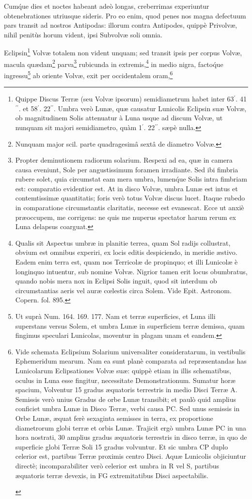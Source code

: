 \documentclass[a4paper, 11pt, oneside, polutonikogreek, german]{article}
\begin{document}
Cum\'que dies et noctes habeant adeò longas, creberrimas experiuntur obtenebrationes utriusque sideris. Pro eo enim, quod penes nos magna defectuum pars transit ad nostros Antipodas: illorum contra Antipodes, quippè Privolvæ, nihil penitùs horum vident, ipsi Subvolvæ soli omnia.

Eclipsin\footnote{Quippe Discus Terræ (seu Volvæ ipsorum) semidiametrum habet inter 63$^{\prime}$. 41$^{\prime\prime}$. et 58$^{\prime}$. 22$^{\prime\prime}$. Umbra verò Lunæ, quæ causatur Lunicolis Eclipsin suæ Volvæ, ob magnitudinem Solis attenuatur à Luna usque ad discum Volvæ, ut nunquam sit majori semidiametro, quàm 1$^{\prime}$. 22$^{\prime\prime}$. sæpè nulla.} Volvæ totalem non vident unquam; sed transit ipsis per corpus Volvæ, macula quædam\footnote{Nunquam major scil. parte quadragesimâ sextâ de diametro Volvæ.} parva\footnote{Propter deminutionem radiorum solarium. Respexi ad ea, quæ in camera causa eveniunt, Sole per angustissimum foramen irradiante. Sed ibi fimbria rubere solet, quia circumstat eam mera umbra, lumen\'que Solis intra fimbriam est: comparatio evidentior est. At in disco Volvæ, umbra Lunæ est intus et contemtissimæ quantitatis; foris verò totus Volvæ discus lucet. Itaque rubedo in comparatione circumstantis claritatis, necesse est evanescat. Ecce ut anxiè præoccupem, me corrigens: ne quis me nuperus spectator harum rerum ex Luna delapsus coarguat.} rubicunda in extremis,\footnote{Qualis sit Aspectus umbræ in planitie terrea, quam Sol radijs collustrat, obvium est omnibus experiri, ex locis editis despiciendo, in meridie æstivo. Eadem enim terra est, quam nos Terricolæ de propinquo; et illi Lunicolæ è longinquo intuentur, sub nomine Volvæ. Nigrior tamen erit locus obumbratus, quando nobis mera nox in Eclipsi Solis inguit, quod sit interdum ob circumstantias aeris vel auræ cœlestis circa Solem. Vide Epit. Astronom. Copern. fol. 895.} in medio nigra, facto\'que ingressu\footnote{Ut suprà Num. 164. 169. 177. Nam et terræ superficies, et Luna illi superstans versus Solem, et umbra Lunæ in superficiem terræ demissa, quam fingimus speculari Lunicolas, moventur in plagam unam et eandem.} ab oriente Volvæ, exit per occidentalem oram,\footnote{Vide schemata Eclipsium Solarium universaliter consideratarum, in vestibulis Ephemeridum mearum. Nam ea sunt planè comparata ad repræsentandas has Lunicolarum Eclipsationes Volvæ suæ: quippè etiam in illis schematibus, oculus in Luna esse fingitur, necessitate Demonstrationum. Sumatur horæ spacium, Volventur 15 gradus æquatoris terrestris in medio Disci Terræ A. Semissis verò unius Gradus de orbe Lunæ transibit; et paulò quid amplius conficiet umbra Lunæ in Disco Terræ, verbi causa PC. Sed unus semissis in Orbe Lunæ, æquat ferè sexaginta semisses in terra, ex proportione diametrorum globi terræ et orbis Lunæ. Trajicit ergò umbra Lunæ PC in una hora nostrati, 30 amplius gradus æquatoris terrestris in disco terræ, in quo de superficie globi Terræ Soli 15 gradus volvuntur. Et sic umbra CP duplo celerior est, partibus Terræ proximis centro Disci. Aquæ Lunicolis objiciuntur directè; incomparabiliter verò celerior est umbra in R vel S, partibus æquatoris terræ devexis, in FG extremitatibus Disci aspectabilis.\begin{figure}[H]

\end{figure}}
\end{document}

